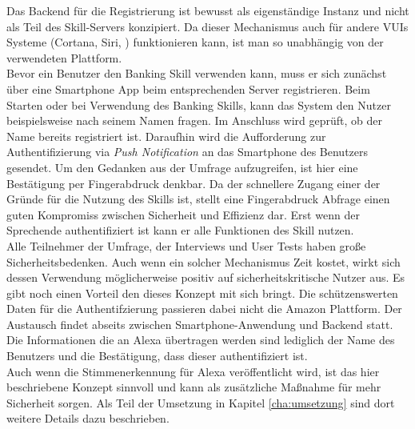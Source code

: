 Das Backend für die Registrierung ist bewusst als eigenständige Instanz und nicht als Teil des Skill-Servers konzipiert. Da dieser Mechanismus auch für andere \acp{VUI} Systeme (Cortana, Siri, \etc) funktionieren kann, ist man so unabhängig von der verwendeten Plattform.\\
Bevor ein Benutzer den Banking Skill verwenden kann, muss er sich zunächst über eine Smartphone App beim entsprechenden Server registrieren. Beim Starten oder bei Verwendung des Banking Skills, kann das System den Nutzer beispielsweise nach seinem Namen fragen. Im Anschluss wird geprüft, ob der Name bereits registriert ist. Daraufhin wird die Aufforderung zur Authentifizierung via \textit{Push Notification} an das Smartphone des Benutzers gesendet. Um den Gedanken aus der Umfrage aufzugreifen, ist hier eine Bestätigung per Fingerabdruck denkbar. Da der schnellere Zugang einer der Gründe für die Nutzung des Skills ist, stellt eine Fingerabdruck Abfrage einen guten Kompromiss zwischen Sicherheit und Effizienz dar. Erst wenn der Sprechende authentifiziert ist kann er alle Funktionen des Skill nutzen.\\
Alle Teilnehmer der Umfrage, der Interviews und User Tests haben große Sicherheitsbedenken. Auch wenn ein solcher Mechanismus Zeit kostet, wirkt sich dessen Verwendung möglicherweise positiv auf sicherheitskritische Nutzer aus. Es gibt noch einen Vorteil den dieses Konzept mit sich bringt. Die schützenswerten Daten für die Authentifzierung passieren dabei nicht die Amazon Plattform. Der Austausch findet abseits zwischen Smartphone-Anwendung und Backend statt. Die Informationen die an Alexa übertragen werden sind lediglich der Name des Benutzers und die Bestätigung, dass dieser authentifiziert ist.\\
Auch wenn die Stimmenerkennung für Alexa veröffentlicht wird, ist das hier beschriebene Konzept sinnvoll und kann als zusätzliche Maßnahme für mehr Sicherheit sorgen. Als Teil der Umsetzung in Kapitel \ref{cha:umsetzung} sind dort weitere Details dazu beschrieben.